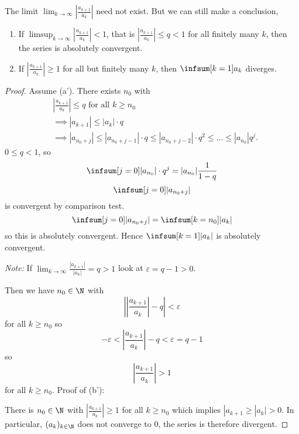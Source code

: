 \documentclass[10pt, a4paper]{article}
\newcommand{\dseq}[2][n]{(#2_#1)_{#1 \in \N}}
\begin{document}
\begin{remark}
    The limit $\displaystyle\lim_{k \to \infty}\left|\frac{a_{k + 1}}{a_k}\right|$ need not exist.
    But we can still make a conclusion,
    \begin{enumerate}[label = (\alph*')]
        \item If $\displaystyle\limsup_{k \to \infty}\left|\frac{a_{k + 1}}{a_k}\right| < 1$,
        that is $\left|\frac{a_{k + 1}}{a_k}\right| \leq q < 1$ for all finitely many $k$,
        then the series is absolutely convergent.
        \item If $\left|\frac{a_{k + 1}}{a_k}\right| \geq 1$ for all but finitely many $k$,
        then $\displaystyle\infsum[k = 1]a_k$ diverges.
    \end{enumerate}
    \begin{proof}
        Assume (a').
        There exists $n_0$ with
        \begin{align*}
            &\left|\frac{a_{k + 1}}{a_k}\right| \leq q\text{ for all } k \geq n_0 \\
            &\implies |a_{k + 1}| \leq |a_k|\cdot q \\
            &\implies |a_{n_0 + j}| \leq |a_{n_0 + j - 1}| \cdot q \leq |a_{n_0 + j - 2}|\cdot q ^ 2 \leq \dotsc \leq |a_{n_0}|q ^ {j}.
        \end{align*}
        $0 \leq q < 1$,
        so
        \[
        \infsum[j = 0]|a_{n_0}| \cdot q ^ j = |a_{n_0}|\frac{1}{1 - q}
        \]
        \[
        \infsum[j = 0]|a_{n_0 + j}|
        \]
        is convergent by comparison test.
        \[
        \infsum[j = 0]|a_{n_0 + j}| = \infsum[k = n_0]|a_k|
        \]
        so this is absolutely convergent.
        Hence $\displaystyle\infsum[k = 1]|a_k|$ is absolutely convergent.
        
        \textit{Note:}
        If $\lim_{k \to \infty}\frac{|a_{k + 1}|}{|a_k|} = q > 1$
        look at $\varepsilon = q - 1 > 0$.
        
        Then we have $n_0 \in \N$ with
        \[
        \left|\left|\frac{a_{k + 1}}{a_k}\right| - q\right| < \varepsilon
        \]
        for all $k \geq n_0$
        so
        \[
        -\varepsilon < \left|\frac{a_{k + 1}}{a_k}\right| - q < \varepsilon = q - 1
        \]
        so
        \[
        \left|\frac{a_{k + 1}}{a_k}\right| > 1
        \]
        for all $k \geq n_0$.
        Proof of (b'):
        
        There is $n_0 \in \N$ with $\left|\frac{a_{k + 1}}{a_k}\right| \geq 1$ for all $k \geq n_0$
        which implies $|a_{k + 1} \geq |a_k| > 0$.
        In particular,
        $\dseq[k]{a}$ does not converge to $0$,
        the series is therefore divergent.
    \end{proof}
\end{remark}
\end{document}

